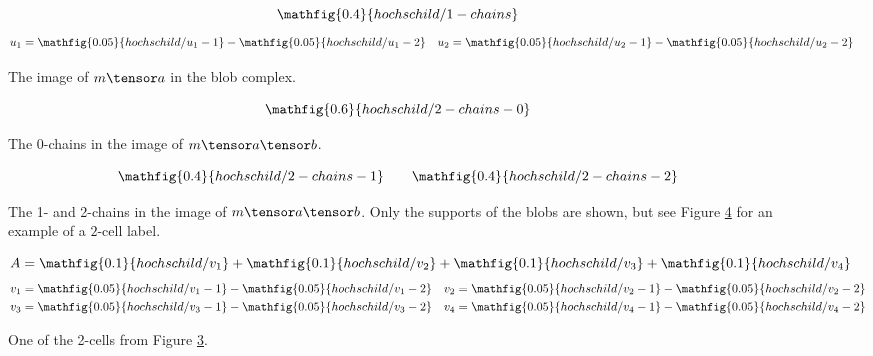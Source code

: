 \begin{figure}[ht]
\begin{equation*}
\mathfig{0.4}{hochschild/1-chains}
\end{equation*}
\begin{align*}
u_1 & = \mathfig{0.05}{hochschild/u_1-1} - \mathfig{0.05}{hochschild/u_1-2} & u_2 & = \mathfig{0.05}{hochschild/u_2-1} - \mathfig{0.05}{hochschild/u_2-2} 
\end{align*}
\caption{The image of $m \tensor a$ in the blob complex.}
\label{fig:hochschild-1-chains}
\end{figure}

\begin{figure}[ht]
\begin{equation*}
\mathfig{0.6}{hochschild/2-chains-0}
\end{equation*}
\caption{The 0-chains in the image of $m \tensor a \tensor b$.}
\label{fig:hochschild-2-chains-0}
\end{figure}
\begin{figure}[ht]
\begin{equation*}
\mathfig{0.4}{hochschild/2-chains-1} \qquad \mathfig{0.4}{hochschild/2-chains-2}
\end{equation*}
\caption{The 1- and 2-chains in the image of $m \tensor a \tensor b$.
Only the supports of the blobs are shown, but see Figure \ref{fig:hochschild-example-2-cell} for an example of a $2$-cell label.}
\label{fig:hochschild-2-chains-12}
\end{figure}

\begin{figure}[ht]
\begin{equation*}
A = \mathfig{0.1}{hochschild/v_1} + \mathfig{0.1}{hochschild/v_2} + \mathfig{0.1}{hochschild/v_3} + \mathfig{0.1}{hochschild/v_4}
\end{equation*}
\begin{align*}
v_1 & = \mathfig{0.05}{hochschild/v_1-1} -  \mathfig{0.05}{hochschild/v_1-2} &  v_2 & = \mathfig{0.05}{hochschild/v_2-1} -  \mathfig{0.05}{hochschild/v_2-2} \\ 
v_3 & = \mathfig{0.05}{hochschild/v_3-1} -  \mathfig{0.05}{hochschild/v_3-2} &  v_4 & = \mathfig{0.05}{hochschild/v_4-1} -  \mathfig{0.05}{hochschild/v_4-2}
\end{align*}
\caption{One of the 2-cells from Figure \ref{fig:hochschild-2-chains-12}.}
\label{fig:hochschild-example-2-cell}
\end{figure}

